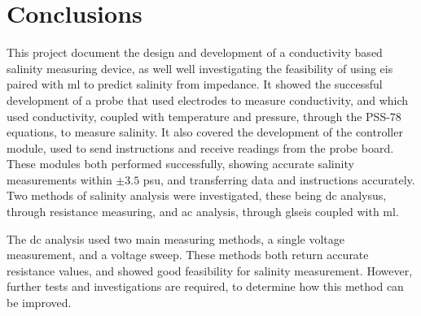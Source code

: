 \chapter{Conclusions}
This project document the design and development of a conductivity based salinity measuring device, as well well investigating the feasibility of using \gls{eis} paired with \gls{ml} to predict salinity from impedance.
It showed the successful development of a probe that used electrodes to measure conductivity, and which used conductivity, coupled with temperature and pressure, through the PSS-78 equations, to measure salinity.
It also covered the development of the controller module, used to send instructions and receive readings from the probe board. These modules both performed successfully, showing accurate salinity measurements within $\pm3.5$ \gls{psu}, and transferring data and instructions accurately.
Two methods of salinity analysis were investigated, these being \gls{dc} analysus, through resistance measuring, and \gls{ac} analysis, through gls{eis} coupled with \gls{ml}.

The \gls{dc} analysis used two main measuring methods, a single voltage measurement, and a voltage sweep. 
These methods both return accurate resistance values, and showed good feasibility for salinity measurement.
However, further tests and investigations are required, to determine how this method can be improved.


